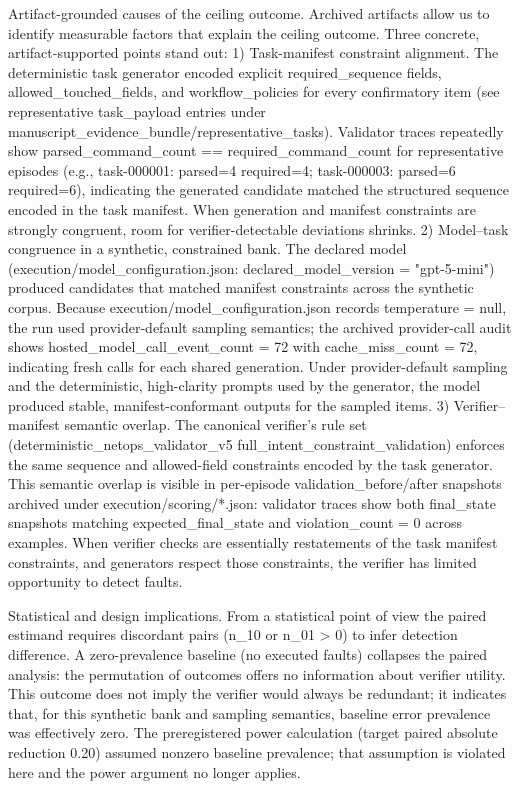 \documentclass[conference]{IEEEtran}
\begin{document}
Artifact-grounded causes of the ceiling outcome. Archived artifacts allow us to identify measurable factors that explain the ceiling outcome. Three concrete, artifact-supported points stand out:
1) Task-manifest constraint alignment. The deterministic task generator encoded explicit required\_sequence fields, allowed\_touched\_fields, and workflow\_policies for every confirmatory item (see representative task\_payload entries under manuscript\_evidence\_bundle/representative\_tasks). Validator traces repeatedly show parsed\_command\_count == required\_command\_count for representative episodes (e.g., task-000001: parsed=4 required=4; task-000003: parsed=6 required=6), indicating the generated candidate matched the structured sequence encoded in the task manifest. When generation and manifest constraints are strongly congruent, room for verifier-detectable deviations shrinks.
2) Model--task congruence in a synthetic, constrained bank. The declared model (execution/model\_configuration.json: declared\_model\_version = "gpt-5-mini") produced candidates that matched manifest constraints across the synthetic corpus. Because execution/model\_configuration.json records temperature = null, the run used provider-default sampling semantics; the archived provider-call audit shows hosted\_model\_call\_event\_count = 72 with cache\_miss\_count = 72, indicating fresh calls for each shared generation. Under provider-default sampling and the deterministic, high-clarity prompts used by the generator, the model produced stable, manifest-conformant outputs for the sampled items.
3) Verifier--manifest semantic overlap. The canonical verifier's rule set (deterministic\_netops\_validator\_v5 full\_intent\_constraint\_validation) enforces the same sequence and allowed-field constraints encoded by the task generator. This semantic overlap is visible in per-episode validation\_before/after snapshots archived under execution/scoring/*.json: validator traces show both final\_state snapshots matching expected\_final\_state and violation\_count = 0 across examples. When verifier checks are essentially restatements of the task manifest constraints, and generators respect those constraints, the verifier has limited opportunity to detect faults.

Statistical and design implications. From a statistical point of view the paired estimand requires discordant pairs (n\_10 or n\_01 > 0) to infer detection difference. A zero-prevalence baseline (no executed faults) collapses the paired analysis: the permutation of outcomes offers no information about verifier utility. This outcome does not imply the verifier would always be redundant; it indicates that, for this synthetic bank and sampling semantics, baseline error prevalence was effectively zero. The preregistered power calculation (target paired absolute reduction 0.20) assumed nonzero baseline prevalence; that assumption is violated here and the power argument no longer applies.
\end{document}
